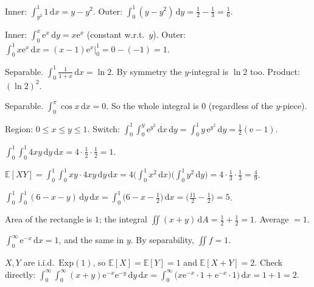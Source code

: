 \begin{solutions}
  \item Inner: $\int_{y^{2}}^{1} 1\,\mathrm{d}x=y-y^{2}$. Outer:
        $\int_{0}^{1} (y-y^{2})\,\mathrm{d}y=\frac{1}{2}-\frac{1}{3}=\frac{1}{6}$.

  \item Inner: $\int_{0}^{x} \mathrm{e}^{x}\,\mathrm{d}y=x\mathrm{e}^{x}$
        (constant w.r.t.\ $y$). Outer:
        $\int_{0}^{1} x\mathrm{e}^{x}\,\mathrm{d}x
        =(x-1)\mathrm{e}^{x}\big|_{0}^{1}=0-(-1)=1$.

  \item Separable. $\int_{0}^{1} \frac{1}{1+x}\,\mathrm{d}x=\ln 2$. By
        symmetry the $y$-integral is $\ln 2$ too. Product: $(\ln 2)^{2}$.

  \item Separable. $\int_{0}^{\pi} \cos x\,\mathrm{d}x=0$. So the whole
        integral is $0$ (regardless of the $y$-piece).

  \item Region: $0\le x\le y\le 1$. Switch:
        $\int_{0}^{1}\int_{0}^{y} \mathrm{e}^{y^{2}}\,\mathrm{d}x\,\mathrm{d}y
        =\int_{0}^{1} y\,\mathrm{e}^{y^{2}}\,\mathrm{d}y
        =\frac{1}{2}(\mathrm{e}-1)$.

  \item $\int_{0}^{1}\int_{0}^{1} 4xy\,\mathrm{d}y\,\mathrm{d}x
        =4\cdot\frac{1}{2}\cdot\frac{1}{2}=1$. \checkmark

  \item $\mathbb{E}[XY]=\int_{0}^{1}\int_{0}^{1} xy\cdot 4xy\,\mathrm{d}y\,\mathrm{d}x
        =4\bigl(\int_{0}^{1} x^{2}\,\mathrm{d}x\bigr)\bigl(\int_{0}^{1} y^{2}\,\mathrm{d}y\bigr)
        =4\cdot\frac{1}{3}\cdot\frac{1}{3}=\frac{4}{9}$.

  \item $\int_{0}^{1}\int_{0}^{1} (6-x-y)\,\mathrm{d}y\,\mathrm{d}x
        =\int_{0}^{1} \bigl(6-x-\tfrac12\bigr)\,\mathrm{d}x
        =\bigl(\tfrac{11}{2}-\tfrac12\bigr)=5$.

  \item Area of the rectangle is $1$; the integral
        $\iint (x+y)\,\mathrm{d}A=\frac{1}{2}+\frac{1}{2}=1$. Average
        $=1$.

  \item $\int_{0}^{\infty} \mathrm{e}^{-x}\,\mathrm{d}x=1$, and the same
        in $y$. By separability, $\iint f=1$. \checkmark

  \item $X,Y$ are i.i.d.\ $\mathrm{Exp}(1)$, so $\mathbb{E}[X]=\mathbb{E}[Y]=1$
        and $\mathbb{E}[X+Y]=2$. Check directly:
        $\int_{0}^{\infty}\int_{0}^{\infty} (x+y)\mathrm{e}^{-x}\mathrm{e}^{-y}\,\mathrm{d}y\,\mathrm{d}x
        =\int_{0}^{\infty} \bigl(x\mathrm{e}^{-x}\cdot 1+\mathrm{e}^{-x}\cdot 1\bigr)\,\mathrm{d}x
        =1+1=2$. \checkmark


\end{solutions}
